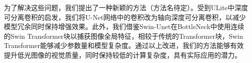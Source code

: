 \documentclass[a4paper]{ctexart}
\begin{document}
%		
%		
%		
%		


%		
		
		为了解决这些问题，我们提出了一种新颖的方法（方法名待定）。受到ULite\cite{dinh20231m}中深度可分离卷积的启发，我们将U-Net网络中的卷积改为轴向深度可分离卷积，以减少模型冗余同时保持增强效果。此外，我们借鉴Swin-Unet\cite{cao2022swin}在BottleNeck中使用连续的Swin Transformer块以捕获图像全局特征，相较于传统的Transformer块，Swin Transformer能够减少参数量和模型复杂度。通过以上改进，我们的方法能够有效提升低光图像的视觉质量，同时保持较低的计算复杂度，具有实际应用的潜力。
		
		
\end{document}
